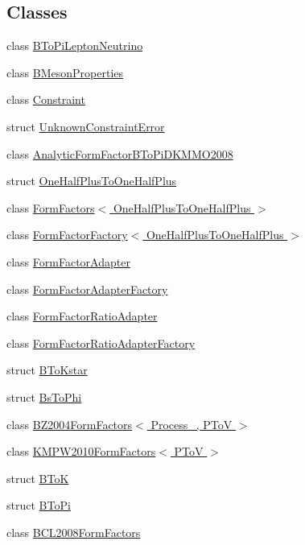 \subsection*{Classes}
\begin{DoxyCompactItemize}
\item 
class \hyperlink{classeos_1_1BToPiLeptonNeutrino}{BToPiLeptonNeutrino}
\item 
class \hyperlink{classeos_1_1BMesonProperties}{BMesonProperties}
\item 
class \hyperlink{classeos_1_1Constraint}{Constraint}
\item 
struct \hyperlink{structeos_1_1UnknownConstraintError}{UnknownConstraintError}
\item 
class \hyperlink{classeos_1_1AnalyticFormFactorBToPiDKMMO2008}{AnalyticFormFactorBToPiDKMMO2008}
\item 
struct \hyperlink{structeos_1_1OneHalfPlusToOneHalfPlus}{OneHalfPlusToOneHalfPlus}
\item 
class \hyperlink{classeos_1_1FormFactors_3_01OneHalfPlusToOneHalfPlus_01_4}{FormFactors$<$ OneHalfPlusToOneHalfPlus $>$}
\item 
class \hyperlink{classeos_1_1FormFactorFactory_3_01OneHalfPlusToOneHalfPlus_01_4}{FormFactorFactory$<$ OneHalfPlusToOneHalfPlus $>$}
\item 
class \hyperlink{classeos_1_1FormFactorAdapter}{FormFactorAdapter}
\item 
class \hyperlink{classeos_1_1FormFactorAdapterFactory}{FormFactorAdapterFactory}
\item 
class \hyperlink{classeos_1_1FormFactorRatioAdapter}{FormFactorRatioAdapter}
\item 
class \hyperlink{classeos_1_1FormFactorRatioAdapterFactory}{FormFactorRatioAdapterFactory}
\item 
struct \hyperlink{structeos_1_1BToKstar}{BToKstar}
\item 
struct \hyperlink{structeos_1_1BsToPhi}{BsToPhi}
\item 
class \hyperlink{classeos_1_1BZ2004FormFactors_3_01Process___00_01PToV_01_4}{BZ2004FormFactors$<$ Process\_\-, PToV $>$}
\item 
class \hyperlink{classeos_1_1KMPW2010FormFactors_3_01PToV_01_4}{KMPW2010FormFactors$<$ PToV $>$}
\item 
struct \hyperlink{structeos_1_1BToK}{BToK}
\item 
struct \hyperlink{structeos_1_1BToPi}{BToPi}
\item 
class \hyperlink{classeos_1_1BCL2008FormFactors}{BCL2008FormFactors}

\end{DoxyCompactItemize}
